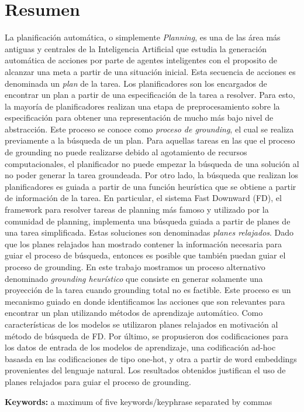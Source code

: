 \chapter*{Resumen}

La planificación automática, o simplemente \emph{Planning}, es una de las área
más antiguas y centrales de la Inteligencia Artificial que estudia la generación
automática de acciones por parte de agentes inteligentes con el proposito de
alcanzar una meta a partir de una situación inicial. Esta secuencia de acciones
es denominada un \emph{plan} de la tarea. Los planificadores son los encargados
de encontrar un plan a partir de una especificación de la tarea a resolver. Para
esto, la mayoría de planificadores realizan una etapa de preprocesamiento sobre
la especificación para obtener una representación de mucho más bajo
nivel de abstracción. Este proceso se conoce como \emph{proceso de grounding},
el cual se realiza previamente a la búsqueda de un plan. Para
aquellas tareas en las que el proceso de grounding no puede realizarse debido al
agotamiento de recursos computacionales, el planificador no puede empezar la
búsqueda de una solución al no poder generar la tarea groundeada. Por otro lado,
la búsqueda que realizan los planificadores es guiada a partir de una función
heurística que se obtiene a partir de información de la tarea. En particular, el
sistema Fast Downward (FD), el framework para resolver tareas de planning más famoso
y utilizado por la comunidad de planning, implementa una búsqueda guiada a
partir de planes de una tarea simplificada. Estas soluciones son denominadas
\emph{planes relajados}. Dado que los planes relajados han mostrado contener la
información necesaria para guiar el proceso de búsqueda, entonces es posible que
también puedan guiar el proceso de grounding. En este trabajo mostramos un
proceso alternativo denominado \emph{grounding heurístico} que consiste en
generar solamente una proyección de la tarea cuando grounding total no es
factible. Este proceso es un mecanismo guiado en donde identificamos las
acciones que son relevantes para encontrar un plan utilizando métodos de
aprendizaje automático. Como características de los modelos se utilizaron planes
relajados en motivación al método de búsqueda de FD. Por último, se propusieron
dos codificaciones para los datos de entrada de los modelos de aprendizaje, una
codificación ad-hoc basasda en las codificaciones de tipo one-hot, y otra a
partir de word embeddings provenientes del lenguaje natural. Los resultados
obtenidos justifican el uso de planes relajados para guiar el proceso de
grounding.


\noindent %
\textbf{Keywords:} a maximum of five keywords/keyphrase separated by commas